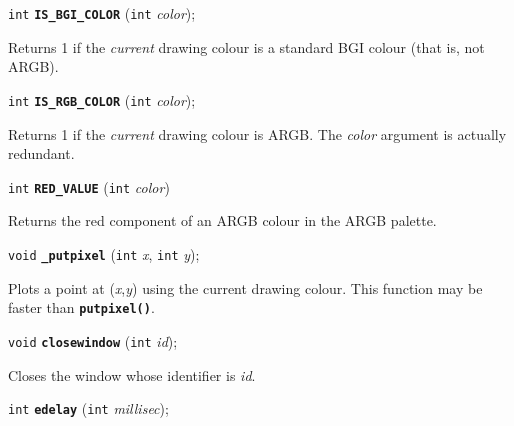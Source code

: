 \documentclass[a4paper,12pt]{article}
\newcommand{\V}{\texttt{void}}      %
\newcommand{\I}{\texttt{int}}       %
\newcommand{\func}[1]{\textbf{\texttt{#1}}}  %
\newcommand{\A}[1]{\emph{#1}}       %
\newenvironment{bgi}
{ %
  \begin{snugshade}
}
{ %
  \end{snugshade}
}
\begin{document}

\label{sec:ISBGICOLOR}

\begin{bgi}
\I{} \func{IS\_BGI\_COLOR} (\I{} \A{color});
\end{bgi}

Returns 1 if the \emph{current} drawing colour is a standard BGI
colour (that is, not ARGB).


\label{sec:ISRGBCOLOR}

\begin{bgi}
\I{} \func{IS\_RGB\_COLOR} (\I{} \A{color});
\end{bgi}

Returns 1 if the \emph{current} drawing colour is ARGB. The \A{color}
argument is actually redundant.


\label{sec:REDVALUE}

\begin{bgi}
\I{} \func{RED\_VALUE} (\I{} \A{color})
\end{bgi}

Returns the red component of an ARGB colour in the ARGB palette.


\label{sec:pputpixel}

\begin{bgi}
\V{} \func{\_putpixel} (\I{} \A{x}, \I{} \A{y});
\end{bgi}

Plots a point at (\A{x},\A{y}) using the current drawing colour. This
function may be faster than \func{putpixel()}.


\label{sec:closewindow}

\begin{bgi}
\V{} \func{closewindow} (\I{} \A{id});
\end{bgi}

Closes the window whose identifier is \A{id}.


\begin{bgi}
\I{} \func{edelay} (\I{} \A{millisec});
\end{bgi}
\end{document}
